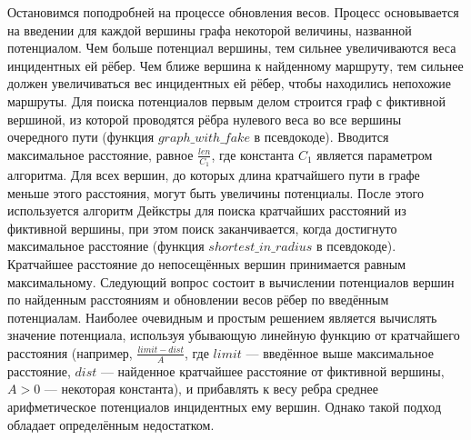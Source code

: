 Остановимся поподробней на процессе обновления весов. Процесс
основывается на введении для каждой вершины графа некоторой величины,
названной потенциалом. Чем больше потенциал вершины, тем сильнее
увеличиваются веса инцидентных ей рёбер. Чем ближе вершина к
найденному маршруту, тем сильнее должен увеличиваться вес инцидентных
ей рёбер, чтобы находились непохожие маршруты. Для поиска потенциалов
первым делом строится граф с фиктивной вершиной, из которой проводятся
рёбра нулевого веса во все вершины очередного пути (функция
$graph\_with\_fake$ в псевдокоде). Вводится максимальное расстояние,
равное $\frac{len}{C_1}$, где константа $C_1$ является параметром
алгоритма. Для всех вершин, до которых длина кратчайшего пути в графе
меньше этого расстояния, могут быть увеличины потенциалы. После этого
используется алгоритм Дейкстры для поиска кратчайших расстояний из
фиктивной вершины, при этом поиск заканчивается, когда достигнуто
максимальное расстояние (функция $shortest\_in\_radius$ в псевдокоде).
Кратчайшее расстояние до непосещённых вершин принимается равным
максимальному. Следующий вопрос состоит в вычислении потенциалов
вершин по найденным расстояниям и обновлении весов рёбер по введённым
потенциалам. Наиболее очевидным и простым решением является вычислять
значение потенциала, используя убывающую линейную функцию от
кратчайшего расстояния (например, $\frac{limit - dist}{A}$, где
$limit$ --- введённое выше максимальное расстояние, $dist$ ---
найденное кратчайшее расстояние от фиктивной вершины, $A > 0$ ---
некоторая константа), и прибавлять к весу ребра среднее арифметическое
потенциалов инцидентных ему вершин. Однако такой подход обладает
определённым недостатком.


